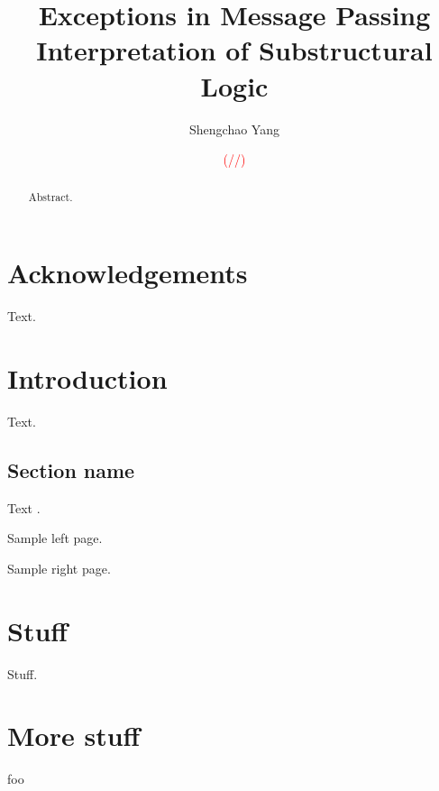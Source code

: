 \documentclass[12pt]{memoir}
\newcommand{\draftstamp}{\textcolor{red}{(\number\month/\number\day/\the\year)}}
\begin{document}
\frontmatter

\pagestyle{empty}

\title{\textbf{Exceptions in Message Passing Interpretation of Substructural Logic}}
\author{Shengchao Yang}
\date{\draftstamp}




\maketitle

\pagestyle{nonumbers}

\begin{abstract}
Abstract.
\end{abstract}

\chapter{Acknowledgements}

Text.

\cleardoublepage
\tableofcontents

\mainmatter

\chapter{Introduction}

Text.

\section{Section name}

Text \citep{HoTT13}.

\clearpage

Sample left page.

\clearpage

Sample right page.

\chapter{Stuff}

Stuff.

\appendix

\chapter{More stuff}

foo

\backmatter

\printbibliography
\end{document}
